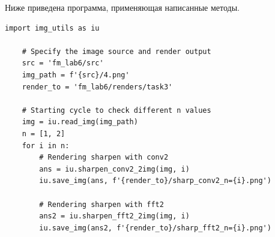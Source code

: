 \documentclass[a4paper, 12pt]{article}
\begin{document}
    Ниже приведена программа, применяющая написанные методы.
    \begin{lstlisting}[label=task33, caption={Реализация задания 3}]
    import img_utils as iu

    # Specify the image source and render output
    src = 'fm_lab6/src'
    img_path = f'{src}/4.png'
    render_to = 'fm_lab6/renders/task3'

    # Starting cycle to check different n values
    img = iu.read_img(img_path)
    n = [1, 2]
    for i in n:
        # Rendering sharpen with conv2
        ans = iu.sharpen_conv2_2img(img, i)
        iu.save_img(ans, f'{render_to}/sharp_conv2_n={i}.png')
        
        # Rendering sharpen with fft2
        ans2 = iu.sharpen_fft2_2img(img, i)
        iu.save_img(ans2, f'{render_to}/sharp_fft2_n={i}.png')
    \end{lstlisting}
\end{document}
